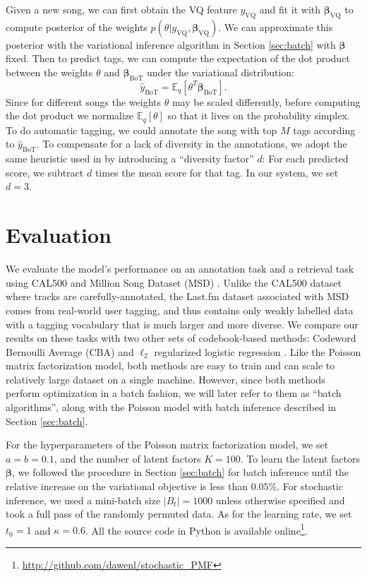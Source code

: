 Given a new song, we can first obtain the VQ feature $y_{\text{VQ}}$ and fit it with $\boldsymbol{\beta}_{\text{VQ}}$ to compute posterior of the weights $p(\theta | y_{\text{VQ}}, \boldsymbol{\beta}_{\text{VQ}})$. We can approximate this posterior with the variational inference algorithm in Section \ref{sec:batch} with $\boldsymbol{\beta}$ fixed. Then to predict tags, we can compute the expectation of the dot product between the weights $\theta$ and $\boldsymbol{\beta}_{\text{BoT}}$ under the variational distribution: 
\begin{equation} \label{eq:score}
\hat{y}_{\text{BoT}} = \mathbb{E}_q[\theta^T \boldsymbol{\beta}_{\text{BoT}}].
\end{equation}
Since for different songs the weights $\theta$ may be scaled differently, before computing the dot product we normalize $\mathbb{E}_q[\theta]$ so that it lives on the probability simplex. To do automatic tagging, we could annotate the song with top $M$ tags according to $\hat{y}_{\text{BoT}}$. To compensate for a lack of diversity in the annotations, we adopt the same heuristic used in \cite{hoffman2009easy} by introducing a ``diversity factor'' $d$: For each predicted score, we subtract $d$ times the mean score for that tag. In our system, we set $d = 3$.

\section{Evaluation}\label{sec:exp}
We evaluate the model's performance on an annotation task and a retrieval task using CAL500 \cite{Turnbull_SemanticAudio} and Million Song Dataset (MSD) \cite{bertin2011million}. Unlike the CAL500 dataset where tracks are carefully-annotated, the Last.fm dataset \cite{lastfm} associated with MSD comes from real-world user tagging, and thus contains only weakly labelled data with a tagging vocabulary that is much larger and more diverse.
 We compare our results on these tasks with two other sets of codebook-based methods: Codeword Bernoulli Average (CBA) \cite{hoffman2009easy} and $\ell_2$ regularized logistic regression \cite{xie2011music}. Like the Poisson matrix factorization model, both methods are easy to train and can scale to relatively large dataset on a single machine. However, since both methods perform optimization in a batch fashion, we will later refer to them as ``batch algorithms'', along with the Poisson model with batch inference described in Section \ref{sec:batch}.

For the hyperparameters of the Poisson matrix factorization model, we set $a = b = 0.1$, and the number of latent factors $K = 100$. To learn the latent factors $\boldsymbol{\beta}$, we followed the procedure in Section \ref{sec:batch} for batch inference until the relative increase on the variational objective is less than $0.05\%$. For stochastic inference, we used a mini-batch size $|B_t| = 1000$ unless otherwise specified and took a full pass of the randomly permuted data. As for the learning rate, we set $t_0 = 1$ and $\kappa = 0.6$. All the source code in Python is available online\footnote{\url{http://github.com/dawenl/stochastic_PMF}}.

